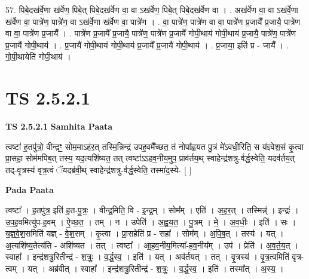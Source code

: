 \documentclass[17pt]{extarticle}
\begin{document}
57. पिबे॒दख॑र्वे॒णा ख॑र्वेण॒ पिबे॒त् पिबे॒दख॑र्वेण वा॒ वा ऽख॑र्वेण॒ पिबे॒त् पिबे॒दख॑र्वेण वा । . अख॑र्वेण वा॒ वा ऽख॑र्वे॒णा ख॑र्वेण वा॒ पात्रे॑ण॒ पात्रे॑ण॒ वा ऽख॑र्वे॒णा ख॑र्वेण वा॒ पात्रे॑ण । . वा॒ पात्रे॑ण॒ पात्रे॑ण वा वा॒ पात्रे॑ण प्र॒जायै᳚ प्र॒जायै॒ पात्रे॑ण वा वा॒ पात्रे॑ण प्र॒जायै᳚ । . पात्रे॑ण प्र॒जायै᳚ प्र॒जायै॒ पात्रे॑ण॒ पात्रे॑ण प्र॒जायै॑ गोपी॒थाय॑ गोपी॒थाय॑ प्र॒जायै॒ पात्रे॑ण॒ पात्रे॑ण प्र॒जायै॑ गोपी॒थाय॑ । . प्र॒जायै॑ गोपी॒थाय॑ गोपी॒थाय॑ प्र॒जायै᳚ प्र॒जायै॑ गोपी॒थाय॑ । . प्र॒जाया॒ इति॑ प्र - जायै᳚ । . गो॒पी॒थायेति॑ गोपी॒थाय॑ । \newline
\pagebreak
{}

\section{ TS 2.5.2.1 }

\textbf{TS 2.5.2.1 } \newline
\textbf{Samhita Paata} \newline

त्वष्टा॑ ह॒तपु॑त्रो॒ वीन्द्रꣳ॒॒ सोम॒माऽह॑र॒त् तस्मि॒न्निन्द्र॑ उपह॒वमै᳚च्छत॒ तं नोपा᳚ह्वयत पु॒त्रं मे॑ऽवधी॒रिति॒ स य॑ज्ञ्वेश॒सं कृ॒त्वा प्रा॒सहा॒ सोम॑मपिब॒त् तस्य॒ यद॒त्यशि॑ष्यत॒ तत् त्वष्टा॑ऽऽहव॒नीय॒मुप॒ प्राव॑र्तय॒थ् स्वाहेन्द्र॑शत्रु-र्वर्द्ध॒स्वेति॒ यदव॑र्तय॒त् तद्-वृ॒त्रस्य॑ वृत्र॒त्वं ॅयदब्र॑वी॒थ् स्वाहेन्द्र॑शत्रु-र्वर्द्ध॒स्वेति॒ तस्मा॑द॒स्ये- [  ] \newline

\textbf{Pada Paata} \newline

त्वष्टा᳚ । ह॒तपु॑त्र॒ इति॑ ह॒त-पु॒त्रः॒ । वीन्द्र॒मिति॒ वि - इ॒न्द्र॒म् । सोम᳚म् । एति॑ । अ॒ह॒र॒त् । तस्मिन्न्॑ । इन्द्रः॑ । उ॒प॒ह॒वमित्यु॑प-ह॒वम् । ऐ॒च्छ॒त॒ । तम् । न । उपेति॑ । अ॒ह्व॒य॒त॒ । पु॒त्रम् । मे॒ । अ॒व॒धीः॒ । इति॑ । सः । य॒ज्ञ्॒वे॒श॒समिति॑ यज्ञ् - वे॒श॒सम् । कृ॒त्वा । प्रा॒सहेति॑ प्र - सहा᳚ । सोम᳚म् । अ॒पि॒ब॒त् । तस्य॑ । यत् । अ॒त्यशि॑ष्य॒तेत्य॑ति - अशि॑ष्यत । तत् । त्वष्टा᳚ । आ॒ह॒व॒नीय॒मित्या᳚-ह॒व॒नीय᳚म् । उप॑ । प्रेति॑ । अ॒व॒र्त॒य॒त् । स्वाहा᳚ । इन्द्र॑शत्रु॒रितीन्द्र॑ - श॒त्रुः॒ । व॒र्द्ध॒स्व॒ । इति॑ । यत् । अव॑र्तयत् । तत् । वृ॒त्रस्य॑ । वृ॒त्र॒त्वमिति॑ वृत्र-त्वम् । यत् । अब्र॑वीत् । स्वाहा᳚ । इन्द्र॑शत्रु॒रितीन्द्र॑ - श॒त्रुः॒ । व॒र्द्ध॒स्व॒ । इति॑ । तस्मा᳚त् । अ॒स्य॒ ।  \newline
\end{document}
